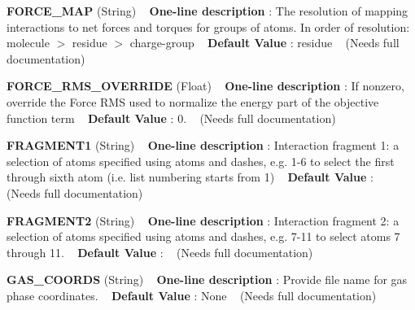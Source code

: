 \begin{DoxyItemize}
\item {\bfseries  F\+O\+R\+C\+E\+\_\+\+M\+AP } (String) ~\newline
{\bfseries  One-\/line description }\+: The resolution of mapping interactions to net forces and torques for groups of atoms. In order of resolution\+: molecule $>$ residue $>$ charge-\/group ~\newline
{\bfseries  Default Value }\+: residue ~\newline
(Needs full documentation)\end{DoxyItemize}
\begin{DoxyItemize}
\item {\bfseries  F\+O\+R\+C\+E\+\_\+\+R\+M\+S\+\_\+\+O\+V\+E\+R\+R\+I\+DE } (Float) ~\newline
{\bfseries  One-\/line description }\+: If nonzero, override the Force R\+MS used to normalize the energy part of the objective function term ~\newline
{\bfseries  Default Value }\+: 0. ~\newline
(Needs full documentation)\end{DoxyItemize}
\begin{DoxyItemize}
\item {\bfseries  F\+R\+A\+G\+M\+E\+N\+T1 } (String) ~\newline
{\bfseries  One-\/line description }\+: Interaction fragment 1\+: a selection of atoms specified using atoms and dashes, e.\+g. 1-\/6 to select the first through sixth atom (i.\+e. list numbering starts from 1) ~\newline
{\bfseries  Default Value }\+: ~\newline
(Needs full documentation)\end{DoxyItemize}
\begin{DoxyItemize}
\item {\bfseries  F\+R\+A\+G\+M\+E\+N\+T2 } (String) ~\newline
{\bfseries  One-\/line description }\+: Interaction fragment 2\+: a selection of atoms specified using atoms and dashes, e.\+g. 7-\/11 to select atoms 7 through 11. ~\newline
{\bfseries  Default Value }\+: ~\newline
(Needs full documentation)\end{DoxyItemize}
\begin{DoxyItemize}
\item {\bfseries  G\+A\+S\+\_\+\+C\+O\+O\+R\+DS } (String) ~\newline
{\bfseries  One-\/line description }\+: Provide file name for gas phase coordinates. ~\newline
{\bfseries  Default Value }\+: None ~\newline
(Needs full documentation)\end{DoxyItemize}
